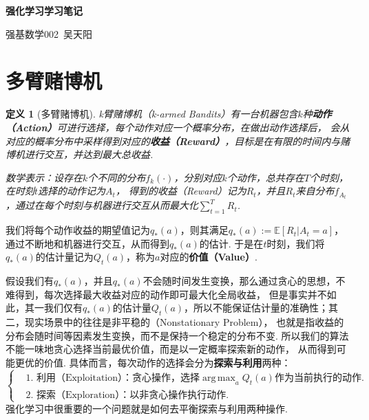 \documentclass[12pt, a4paper, oneside]{ctexart}
\newtheorem{definition}{定义}
\numberwithin{equation}{section}  %
\newenvironment{myTitle}[1]{
    \begin{center}
    {\zihao{-2}\bf #1\\}
    \zihao{-4}\it
}{\end{center}}  %
\DeclareMathOperator*{\argmax}{arg\,max}  %
\def\E{\mathbb{E}}          %
\begin{document}
\begin{myTitle}{强化学习学习笔记}
    强基数学002\ 吴天阳
\end{myTitle}
\setcounter{section}{1}
\section{多臂赌博机}
\begin{definition}[多臂赌博机]
    k臂赌博机（k-armed Bandits）有一台机器包含$k$种\textbf{动作（Action）}可进行选择，每个动作对应一个概率分布，在做出动作选择后，
    会从对应的概率分布中采样得到对应的\textbf{收益（Reward）}，目标是在有限的时间内与赌博机进行交互，并达到最大总收益.

    数学表示：设存在$k$个不同的分布$f_k(\cdot)$，分别对应$k$个动作，总共存在$T$个时刻，在时刻$t$选择的动作记为$A_t$，
    得到的收益（Reward）记为$R_t$，并且$R_t$来自分布$f_{A_t}$，通过在每个时刻与机器进行交互从而最大化$\sum_{t=1}^TR_t$.
\end{definition}

我们将每个动作收益的期望值记为$q_*(a)$，则其满足$q_*(a) := \E[R_t|A_t = a]$，通过不断地和机器进行交互，从而得到$q_*(a)$的估计. 
于是在$t$时刻，我们将$q_*(a)$的估计量记为$Q_t(a)$，称为$a$对应的\textbf{价值（Value）}.

假设我们有$q_*(a)$，并且$q_*(a)$不会随时间发生变换，那么通过贪心的思想，不难得到，每次选择最大收益对应的动作即可最大化全局收益，
但是事实并不如此，其一我们仅有$q_*(a)$的估计量$Q_t(a)$，所以不能保证估计量的准确性；其二，现实场景中的往往是非平稳的（Nonstationary Problem），
也就是指收益的分布会随时间等因素发生变换，而不是保持一个稳定的分布不变. 所以我们的算法不能一味地贪心选择当前最优价值，而是以一定概率探索新的动作，
从而得到可能更优的价值. 具体而言，每次动作的选择会分为\textbf{探索与利用}两种：
\begin{equation*}
    \left\{
        \begin{aligned}
            &\text{1. 利用（Exploitation）：贪心操作，选择}\argmax_{a}Q_t(a)\text{作为当前执行的动作.}\\
            &\text{2. 探索（Exploration）：以非贪心操作执行动作.}
        \end{aligned}
    \right.
\end{equation*}
强化学习中很重要的一个问题就是如何去平衡探索与利用两种操作.
\end{document}
